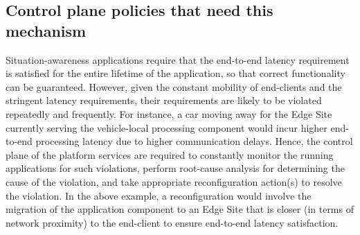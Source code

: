 \subsection{Control plane policies that need this mechanism}
Situation-awareness applications require that the end-to-end latency requirement is satisfied for the entire lifetime of the application, so that correct functionality can be guaranteed. However, given the constant mobility of end-clients and the stringent latency requirements, their requirements are likely to be violated repeatedly and frequently. For instance, a car moving away for the Edge Site currently serving the vehicle-local processing component would incur higher end-to-end processing latency due to higher communication delays. Hence, the control plane of the platform services are required to constantly monitor the running applications for such violations, perform root-cause analysis for determining the cause of the violation, and take appropriate reconfiguration action(s) to resolve the violation. In the above example, a reconfiguration would involve the migration of the application component to an Edge Site that is closer (in terms of network proximity) to the end-client to ensure end-to-end latency satisfaction.

